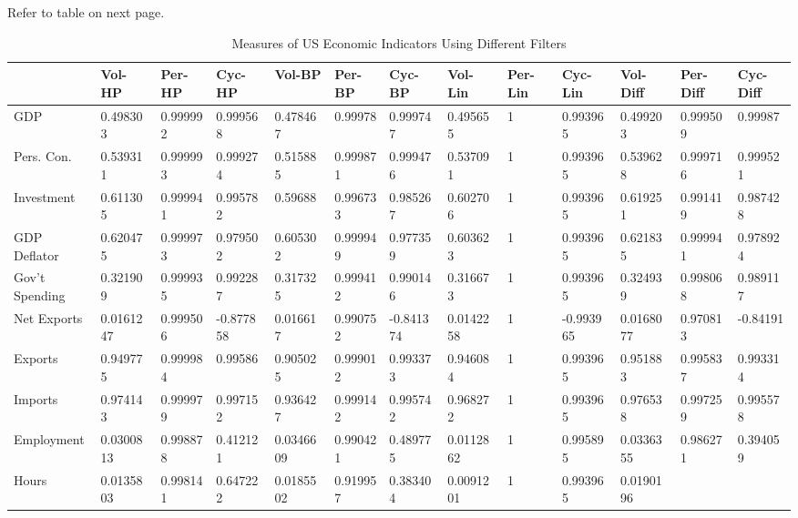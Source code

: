 \documentclass[letterpaper,11pt]{article}
\theoremstyle{definition}
\begin{document}
\begin{spacing}{1.5}
    \begin{Exercise} \label{Filter_HW_Moments}
			Refer to table on next page.
		\end{Exercise}
			\begin{table}
				\centering\footnotesize
				\caption{Measures of US Economic Indicators Using Different Filters}
        \begin{tabular}{lllllllllllll}
					\toprule {} & Vol-HP & Per-HP & Cyc-HP & Vol-BP & Per-BP & Cyc-BP & Vol-Lin & Per-Lin & Cyc-Lin & Vol-Diff & Per-Diff & Cyc-Diff \\
					\midrule
					GDP                   &      0.498303 &       0.999992 &       0.999568 &      0.478467 &        0.99978 &       0.999747 &       0.495655 &               1 &        0.993965 &        0.499203 &         0.999509 &          0.99987 \\Pers. Con.  &      0.539311 &       0.999993 &       0.999274 &      0.515885 &       0.999871 &       0.999476 &       0.537091 &               1 &        0.993965 &        0.539628 &         0.999716 &         0.999521 \\Investment            &      0.611305 &       0.999941 &       0.995782 &       0.59688 &       0.996733 &       0.985267 &       0.602706 &               1 &        0.993965 &        0.619251 &         0.991419 &         0.987428 \\GDP Deflator          &      0.620475 &       0.999973 &       0.979502 &      0.605302 &       0.999949 &       0.977359 &       0.603623 &               1 &        0.993965 &        0.621835 &         0.999941 &         0.978924 \\Gov't Spending   &      0.321909 &       0.999935 &       0.992287 &      0.317325 &       0.999412 &       0.990146 &       0.316673 &               1 &        0.993965 &        0.324939 &         0.998068 &         0.989117 \\Net Exports           &     0.0161247 &       0.999506 &      -0.877858 &      0.016617 &       0.990752 &      -0.841374 &      0.0142258 &               1 &       -0.993965 &       0.0168077 &         0.970813 &         -0.84191 \\Exports               &      0.949775 &       0.999984 &        0.99586 &      0.905025 &       0.999012 &       0.993373 &       0.946084 &               1 &        0.993965 &        0.951883 &         0.995837 &         0.993314 \\Imports               &      0.974143 &       0.999979 &       0.997152 &      0.936427 &       0.999142 &       0.995742 &       0.968272 &               1 &        0.993965 &        0.976538 &         0.997259 &         0.995578 \\Employment       &     0.0300813 &       0.998878 &       0.412121 &     0.0346609 &       0.990421 &       0.489775 &      0.0112862 &               1 &        0.995895 &       0.0336355 &         0.986271 &         0.394059 \\Hours                 &     0.0135803 &       0.998141 &       0.647222 &     0.0185502 &       0.919957 &       0.383404 &      0.0091201 &               1 &        0.993965 &       0.0190196 & 
\end{tabular}
\end{table}
\end{spacing}
\end{document}
